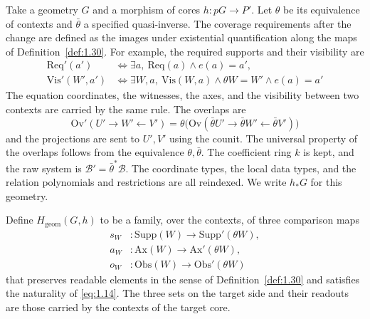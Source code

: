 \begin{construction}\label{cons:4.8}

Take a geometry $G$ and a morphism of cores $h:pG\to P'$.
Let $\theta$ be its equivalence of contexts and $\bar\theta$ a specified quasi-inverse.
The coverage requirements after the change are defined as the images under existential
quantification along the maps of Definition~\ref{def:1.30}.
For example, the required supports and their visibility are
\begin{equation*}
\begin{aligned}
\mathrm{Req}'(a')
 &\Longleftrightarrow \exists a,\ \mathrm{Req}(a)\land e(a)=a',\\
\mathrm{Vis}'(W',a')
 &\Longleftrightarrow
 \exists W,a,\ \mathrm{Vis}(W,a)\land\theta W=W'\land e(a)=a'
\end{aligned}
\tag{4.9}\label{eq:4.9}
\end{equation*}
The equation coordinates, the witnesses, the axes, and the visibility between two contexts
are carried by the same rule.
The overlaps are
\begin{equation*}
\mathrm{Ov}'(U'\to W'\leftarrow V')
=\theta\bigl(\mathrm{Ov}(\bar\theta U'\to
\bar\theta W'\leftarrow\bar\theta V')\bigr)
\tag{4.10}\label{eq:4.10}
\end{equation*}
and the projections are sent to $U',V'$ using the counit.
The universal property of the overlaps follows from the equivalence $\theta,\bar\theta$.
The coefficient ring $k$ is kept, and the raw system is
$\mathcal{B}'=\bar\theta^*\mathcal{B}$.
The coordinate types, the local data types, and the relation polynomials and restrictions
are all reindexed.
We write $h_*G$ for this geometry.

\end{construction}

\begin{definition}\label{def:4.9}

Define $H_{\mathrm{geom}}(G,h)$ to be a family, over the contexts, of three comparison maps
\begin{equation*}
\begin{aligned}
s_W&:\mathrm{Supp}(W)\to\mathrm{Supp}'(\theta W),\\
a_W&:\mathrm{Ax}(W)\to\mathrm{Ax}'(\theta W),\\
o_W&:\mathrm{Obs}(W)\to\mathrm{Obs}'(\theta W)
\end{aligned}
\tag{4.11}\label{eq:4.11}
\end{equation*}
that preserves readable elements in the sense of Definition~\ref{def:1.30} and satisfies
the naturality of \eqref{eq:1.14}.
The three sets on the target side and their readouts are those carried by the contexts of
the target core.

\end{definition}

